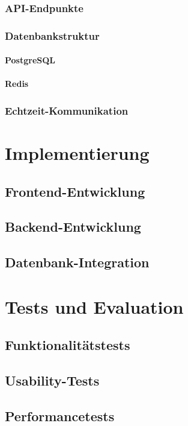 \documentclass[a4paper,12pt]{report}
\begin{document}
        \subsection{API-Endpunkte}
        \subsection{Datenbankstruktur}
        		\subsubsection{PostgreSQL}
        		\subsubsection{Redis}
        \subsection{Echtzeit-Kommunikation}

\chapter{Implementierung}
    \section{Frontend-Entwicklung}
    \section{Backend-Entwicklung}
    \section{Datenbank-Integration}

\chapter{Tests und Evaluation}
    \section{Funktionalitätstests}
    \section{Usability-Tests}
    \section{Performancetests}
\end{document}
